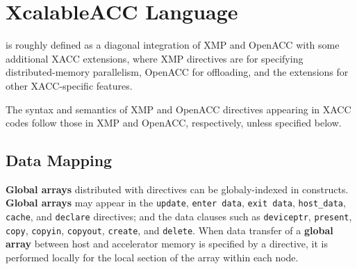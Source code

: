 \section{XcalableACC Language}

{\XACC} is roughly defined as a diagonal integration of XMP
and OpenACC with some additional XACC extensions, where XMP directives
are for specifying distributed-memory parallelism, OpenACC for
offloading, and the extensions for other XACC-specific features.

The syntax and semantics of XMP and OpenACC directives appearing in XACC
codes follow those in XMP and OpenACC, respectively, unless specified
below.

\subsection{Data Mapping}





{\bf Global arrays} distributed with {\XMP} directives can be
globaly-indexed in {\OACC} constructs.
%
{\bf Global arrays} may appear in the {\tt update}, {\tt enter
data}, {\tt exit data}, {\tt host\_data}, {\tt cache}, and {\tt declare}
directives;
%
and the data clauses such as {\tt deviceptr}, {\tt present}, {\tt copy},
{\tt copyin}, {\tt copyout}, {\tt create}, and {\tt delete}.
%
When data transfer of a {\bf global array} between host and accelerator
memory is specified by a {\OACC} directive, it is performed locally for
the local section of the array within each node.

